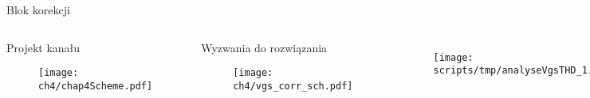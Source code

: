 \begin{frame}{Blok korekcji}
\begin{columns}

    \begin{block}{
        Projekt kanału}
        \begin{figure}[H]
            \centering
            \texttt{[image: ch4/chap4Scheme.pdf]}
        \end{figure} 
        \end{block}

        \begin{block}{
            Wyzwania do rozwiązania}
            \begin{figure}[H]
                \centering
                \texttt{[image: ch4/vgs\_corr\_sch.pdf]} 
            \end{figure}   
            \end{block}



    \begin{columns}

    \begin{figure}[H]
        \centering
        \texttt{[image: scripts/tmp/analyseVgsTHD\_1.pdf]}
    \end{figure} 
    \begin{figure}[H]
        \centering
        \texttt{[image: scripts/tmp/analyseVgsTHD\_2.pdf]}
    \end{figure} 
    \end{columns}   

    \begin{columns}

    \begin{figure}[H]
        \centering
        \texttt{[image: ch4/vgs\_corr0.pdf]}
    \end{figure} 
    \begin{figure}[H]
        \centering
        \texttt{[image: ch4/vgs\_corr1.pdf]}
    \end{figure} 
    \end{columns}   
\end{columns}  
\end{frame}




